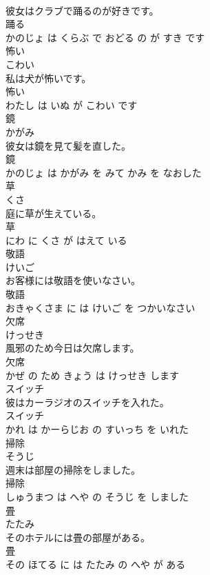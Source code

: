 \documentclass[8pt]{extreport}
\begin{document}
\begin{CJK}{UTF8}{min}
\\	彼女はクラブで踊るのが好きです。	
\\	踊る 
\\	かのじょ は くらぶ で おどる の が すき です			
\\	怖い	
\\	こわい			
\\	私は犬が怖いです。	
\\	怖い 
\\	わたし は いぬ が こわい です			
\\	鏡	
\\	かがみ			
\\	彼女は鏡を見て髪を直した。	
\\	鏡 
\\	かのじょ は かがみ を みて かみ を なおした			
\\	草	
\\	くさ			
\\	庭に草が生えている。	
\\	草 
\\	にわ に くさ が はえて いる			
\\	敬語	
\\	けいご			
\\	お客様には敬語を使いなさい。	
\\	敬語 
\\	おきゃくさま に は けいご を つかいなさい			
\\	欠席	
\\	けっせき			
\\	風邪のため今日は欠席します。	
\\	欠席 
\\	かぜ の ため きょう は けっせき します			
\\	スイッチ	
\\	彼はカーラジオのスイッチを入れた。	
\\	スイッチ 
\\	かれ は かーらじお の すいっち を いれた			
\\	掃除	
\\	そうじ			
\\	週末は部屋の掃除をしました。	
\\	掃除 
\\	しゅうまつ は へや の そうじ を しました			
\\	畳	
\\	たたみ			
\\	そのホテルには畳の部屋がある。	
\\	畳 
\\	その ほてる に は たたみ の へや が ある			

\end{CJK}
\end{document}

